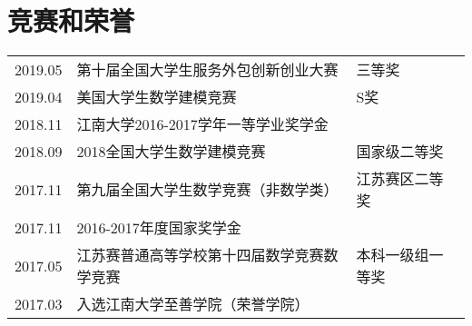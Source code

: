\documentclass[]{deedy-resume-openfont}
\begin{document}
\begin{minipage}[t]{0.73\textwidth}

	\section{竞赛和荣誉}
    \begin{tabular}{lll}
        2019.05 & 第十届全国大学生服务外包创新创业大赛 & 三等奖 \\
        2019.04 & 美国大学生数学建模竞赛 & S奖 \\
        2018.11 & 江南大学2016-2017学年一等学业奖学金 &  \\
        2018.09 & 2018全国大学生数学建模竞赛 & 国家级二等奖 \\
        2017.11 & 第九届全国大学生数学竞赛（非数学类） & 江苏赛区二等奖 \\
        2017.11 & 2016-2017年度国家奖学金 & \\
        2017.05 & 江苏赛普通高等学校第十四届数学竞赛数学竞赛 & 本科一级组一等奖\\
        2017.03 & 入选江南大学至善学院（荣誉学院）& \\
	\end{tabular}
\end{minipage}
\end{document}

